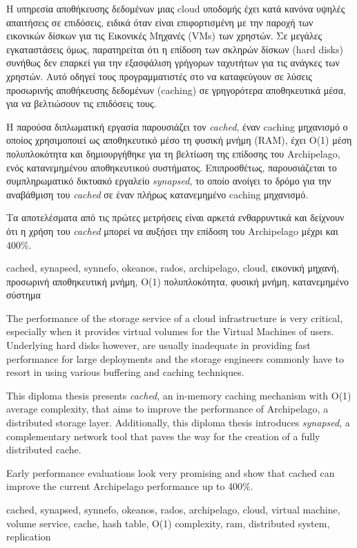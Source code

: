 \begin{abstractgr}
	Η υπηρεσία αποθήκευσης δεδομένων μιας cloud υποδομής έχει κατά κανόνα 
	υψηλές απαιτήσεις σε επιδόσεις, ειδικά όταν είναι επιφορτισμένη με την 
	παροχή των εικονικών δίσκων για τις Εικονικές Μηχανές (VMs) των χρηστών. Σε 
	μεγάλες εγκαταστάσεις όμως, παρατηρείται ότι η επίδοση των σκληρών δίσκων 
	(hard disks) συνήθως δεν επαρκεί για την εξασφάλιση γρήγορων ταχυτήτων για 
	τις ανάγκες των χρηστών. Αυτό οδηγεί τους προγραμματιστές στο να 
	καταφεύγουν σε λύσεις προσωρινής αποθήκευσης δεδομένων (caching) σε 
	γρηγορότερα αποθηκευτικά μέσα, για να βελτιώσουν τις επιδόσεις τους.
	
	Η παρούσα διπλωματική εργασία παρουσιάζει τον \textit{cached}, έναν caching 
	μηχανισμό ο οποίος χρησιμοποιεί ως αποθηκευτικό μέσο τη φυσική μνήμη (RAM), 
	έχει Ο(1) μέση πολυπλοκότητα και δημιουργήθηκε για τη βελτίωση της επίδοσης 
	του Archipelago, ενός κατανεμημένου αποθηκευτικού συστήματος.	
	Επιπροσθέτως, παρουσιάζεται το συμπληρωματικό δικτυακό εργαλείο 
	\textit{synapsed}, το οποίο ανοίγει το δρόμο για την αναβάθμιση του 
	\textit{cached} σε έναν πλήρως κατανεμημένο caching μηχανισμό.
	
	Τα αποτελέσματα από τις πρώτες μετρήσεις είναι αρκετά ενθαρρυντικά και 
	δείχνουν ότι η χρήση του \textit{cached} μπορεί να αυξήσει την επίδοση του 
	Archipelago μέχρι και 400\%.
	\begin{keywordsgr}
		cached, synapsed, synnefo, okeanos, rados, archipelago, cloud, εικονική 
		μηχανή, προσωρινή αποθηκευτική μνήμη, Ο(1) πολυπλοκότητα, φυσική μνήμη, 
		κατανεμημένο σύστημα
		\end{keywordsgr}
\end{abstractgr}

\begin{abstracten}
	The performance of the storage service of a cloud infrastructure is very 
	critical, especially when it provides virtual volumes for the Virtual
	Machines of users. Underlying hard disks however, are usually inadequate in 
	providing fast performance for large deployments and the storage engineers 
	commonly have to resort in using various buffering and caching techniques.
	
	This diploma thesis presents \textit{cached}, an in-memory caching 
	mechanism with O(1) average complexity, that aims to improve the 
	performance of Archipelago, a distributed storage layer. Additionally, this 
	diploma thesis introduces \textit{synapsed}, a complementary network tool 
	that paves the way for the creation of a fully distributed cache.
	
	Early performance evaluations look very promising and show that cached can 
	improve the current Archipelago performance up to 400\%.
	\begin{keywordsen}
		cached, synapsed, synnefo, okeanos, rados, archipelago, cloud, virtual 
		machine, volume service, cache, hash table,  Ο(1) complexity, ram, 
		distributed system, replication
	\end{keywordsen}
\end{abstracten}

\begin{acknowledgementsgr}
	\todo
\end{acknowledgementsgr}
